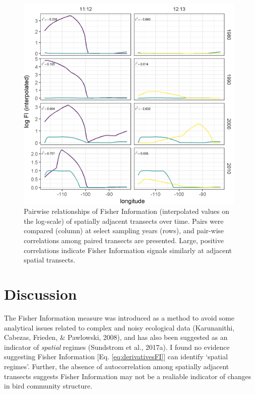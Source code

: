 \documentclass[12pt,twoside,openany]{reedthesis}
\begin{document}
\begin{figure}
\includegraphics[width=0.95\linewidth]{./chapterFiles/fisherSpatial/figures/figsCalledInDiss/interpolated_FI_corplotSelectTransects_East-West_log} \caption{Pairwise relationships of Fisher Information (interpolated values on the log-scale) of spatially adjacent transects over time. Pairs were compared (column) at select sampling years (rows), and pair-wise correlations among paired transects are presented. Large, positive correlations indicate Fisher Information signals similarly at adjacent spatial transects.}\label{fig:corPlotTsectsInterpLog}
\end{figure}
\section{Discussion}\label{discussion-1}

The Fisher Information measure was introduced as a method to avoid some
analytical issues related to complex and noisy ecological data
(Karunanithi, Cabezas, Frieden, \& Pawlowski, 2008), and has also been
suggested as an indicator of \emph{spatial} regimes (Sundstrom et al.,
2017a). I found no evidence suggesting Fisher Information {[}Eq.
\eqref{eq:derivativesFI}{]} can identify `spatial regimes'. Further, the
absence of autocorrelation among spatially adjacent transects suggests
Fisher Information may not be a realiable indicator of changes in bird
community structure.
\end{document}
